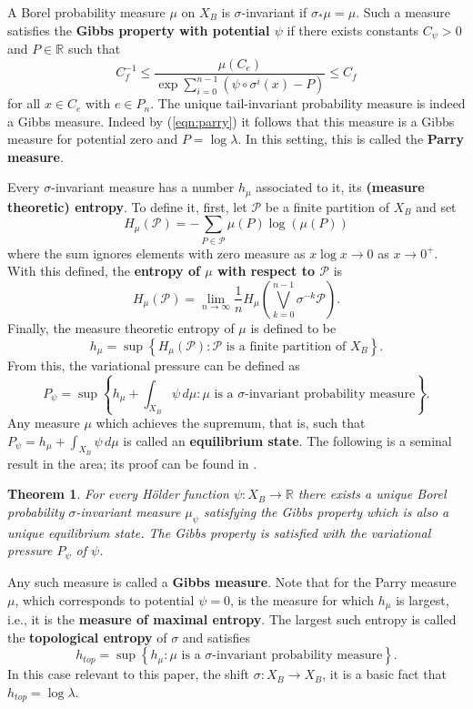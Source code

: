 \documentclass[12pt]{amsart}
\theoremstyle{plain}
\newtheorem*{thm}{Theorem}
\theoremstyle{definition}
\begin{document}
A Borel probability measure $\mu$ on $X_B$ is $\sigma$-invariant if $\sigma_*\mu = \mu$. Such a measure satisfies the \textbf{Gibbs property with potential $\psi$} if there exists constants $C_\psi>0$ and $P\in\mathbb{R}$ such that
 $$C_f^{-1} \leq \frac{\mu(C_e)}{\displaystyle \exp \sum_{i=0}^{n-1}(\psi \circ \sigma^i(x)-P)}\leq C_f$$
for all $x\in C_e $ with $e\in P_n$.  The unique tail-invariant probability measure is indeed a Gibbs measure. Indeed by (\ref{eqn:parry}) it follows that this measure is a Gibbs measure for potential zero and $P = \log \lambda$. In this setting, this is called the \textbf{Parry measure}. 

Every $\sigma$-invariant measure has a number $h_\mu$ associated to it, its \textbf{(measure theoretic) entropy}. To define it, first, let $\mathcal{P}$ be a finite partition of $X_B$ and set 
$$H_\mu(\mathcal{P}) = -\sum_{P\in\mathcal{P}}\mu(P)\log(\mu(P))$$
where the sum ignores elements with zero measure as $x\log x\rightarrow 0$ as $x\rightarrow 0^+$. With this defined, the \textbf{entropy of $\mu$ with respect to $\mathcal{P}$} is
$$H_\mu(\mathcal{P}) = \lim_{n\rightarrow \infty }\frac1n  H_\mu\left( \bigvee_{k=0}^{n-1} \sigma^{-k}\mathcal{P}\right).$$
Finally, the measure theoretic entropy of $\mu$ is defined to be
$$h_\mu = \sup \left\{H_\mu(\mathcal{P}):\mbox{$\mathcal{P}$ is a finite partition of $X_B$}  \right\}.$$
From this, the variational pressure can be defined as
$$P_\psi = \sup \left\{ h_\mu + \int_{X_B}\psi\, d\mu: \mu\mbox{ is a $\sigma$-invariant probability measure} \right\}.$$
Any measure $\mu$ which achieves the supremum, that is, such that $P_\psi = h_\mu+\int_{X_B}\psi\, d\mu$ is called an \textbf{equilibrium state}. The following is a seminal result in the area; its proof can be found in \cite{Bowen:book}.
\begin{thm}
    For every H\"older function $\psi:X_B\rightarrow \mathbb{R}$ there exists a unique Borel probability $\sigma$-invariant measure $\mu_\psi$ satisfying the Gibbs property which is also a unique equilibrium state. The Gibbs property is satisfied with the variational pressure $P_\psi$ of $\psi$.
\end{thm}

Any such measure is called a \textbf{Gibbs measure}.  Note that for the Parry measure $\mu$, which corresponds to potential $\psi = 0$, is the measure for which $h_\mu$ is largest, i.e., it is the \textbf{measure of maximal entropy}. The largest such entropy is called the \textbf{topological entropy} of $\sigma$ and satisfies
$$h_{top} = \sup \left\{ h_\mu: \mu \mbox{ is a $\sigma$-invariant probability measure} \right\}.$$
In this case relevant to this paper, the shift $\sigma:X_B\rightarrow X_B$, it is a basic fact that $h_{top} = \log \lambda$.
\end{document}
